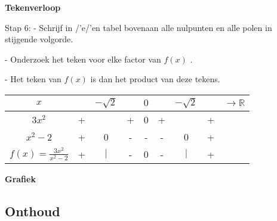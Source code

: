\textbf{Tekenverloop}

Stap 6: - Schrijf in /'e/'en tabel bovenaan alle nulpunten en alle polen
in stijgende volgorde. 

- Onderzoek het teken voor elke factor van $f(x)$ . 

- Het teken van $f(x)$ is dan het product van deze tekens.

\medskip{}


\begin{tabular}{|c||c|c|c|c|c|c|c|c|}
\hline 
$x$ &  & $-\sqrt{2}$ &  & $0$ &  & $-\sqrt{2}$ &  & ${\displaystyle \longrightarrow\mathbb{R}}$\tabularnewline
\hline 
\hline 
${\displaystyle 3x^{2}}$ & + &  & + & 0 & + &  & + & \tabularnewline
\hline 
${\displaystyle x^{2}-2}$ & + & 0 & - & - & - & 0 & + & \tabularnewline
\hline 
\hline 
${\displaystyle f(x)=\frac{3x^{2}}{x^{2}-2}}$ & + & $\mid$ & - & 0 & - & $\mid$ & + & \tabularnewline
\hline 
\end{tabular}

\textbf{Grafiek}



\medskip{}



\subsection{Onthoud}

